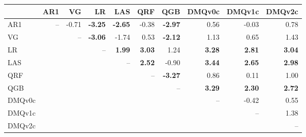 \begin{tabular}{lrrrrrrrrr}
\toprule
 & AR1 & VG & LR & LAS & QRF & QGB & DMQv0c & DMQv1c & DMQv2c \\
\midrule
AR1 & -- & -0.71 & \textbf{-3.25} & \textbf{-2.65} & -0.38 & \textbf{-2.97} & 0.56 & -0.03 & 0.78 \\
VG &  & -- & \textbf{-3.06} & -1.74 & 0.53 & \textbf{-2.12} & 1.13 & 0.65 & 1.43 \\
LR &  &  & -- & \textbf{1.99} & \textbf{3.03} & 1.24 & \textbf{3.28} & \textbf{2.81} & \textbf{3.04} \\
LAS &  &  &  & -- & \textbf{2.52} & -0.90 & \textbf{3.44} & \textbf{2.65} & \textbf{2.98} \\
QRF &  &  &  &  & -- & \textbf{-3.27} & 0.86 & 0.11 & 1.00 \\
QGB &  &  &  &  &  & -- & \textbf{3.29} & \textbf{2.30} & \textbf{2.72} \\
DMQv0c &  &  &  &  &  &  & -- & -0.42 & 0.55 \\
DMQv1c &  &  &  &  &  &  &  & -- & 1.38 \\
DMQv2c &  &  &  &  &  &  &  &  & -- \\
\bottomrule
\end{tabular}

